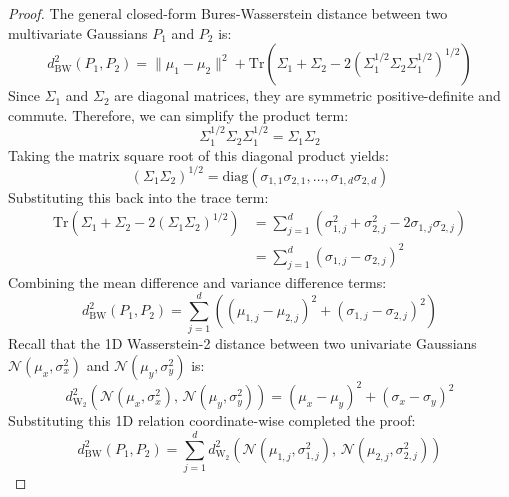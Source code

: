 \documentclass{article}
\theoremstyle{plain}
\theoremstyle{definition}
\theoremstyle{remark}
\begin{document}
\begin{proof}
The general closed-form Bures-Wasserstein distance between two multivariate Gaussians $P_1$ and $P_2$ is:
\begin{equation}
  d_{\mathrm{BW}}^2(P_1, P_2) = \|\mu_1 - \mu_2\|^2 + \mathrm{Tr}\left( \Sigma_1 + \Sigma_2 - 2 \left( \Sigma_1^{1/2} \Sigma_2 \Sigma_1^{1/2} \right)^{1/2} \right)
\end{equation}
Since $\Sigma_1$ and $\Sigma_2$ are diagonal matrices, they are symmetric positive-definite and commute. Therefore, we can simplify the product term:
\begin{equation}
  \Sigma_1^{1/2} \Sigma_2 \Sigma_1^{1/2} = \Sigma_1 \Sigma_2
\end{equation}
Taking the matrix square root of this diagonal product yields:
\begin{equation}
  \left( \Sigma_1 \Sigma_2 \right)^{1/2} = \mathrm{diag}(\sigma_{1, 1}\sigma_{2, 1}, \dots, \sigma_{1, d}\sigma_{2, d})
\end{equation}
Substituting this back into the trace term:
\begin{equation}
\begin{split}
  \mathrm{Tr}\left( \Sigma_1 + \Sigma_2 - 2 \left( \Sigma_1 \Sigma_2 \right)^{1/2} \right) &= \sum_{j=1}^d \left( \sigma_{1, j}^2 + \sigma_{2, j}^2 - 2 \sigma_{1, j} \sigma_{2, j} \right) \\
  &= \sum_{j=1}^d (\sigma_{1, j} - \sigma_{2, j})^2
\end{split}
\end{equation}
Combining the mean difference and variance difference terms:
\begin{equation}
  d_{\mathrm{BW}}^2(P_1, P_2) = \sum_{j=1}^d \left( (\mu_{1, j} - \mu_{2, j})^2 + (\sigma_{1, j} - \sigma_{2, j})^2 \right)
\end{equation}
Recall that the 1D Wasserstein-2 distance between two univariate Gaussians $\mathcal{N}(\mu_x, \sigma_x^2)$ and $\mathcal{N}(\mu_y, \sigma_y^2)$ is:
\begin{equation}
  d_{\mathrm{W}_2}^2\left( \mathcal{N}(\mu_x, \sigma_x^2), \, \mathcal{N}(\mu_y, \sigma_y^2) \right) = (\mu_x - \mu_y)^2 + (\sigma_x - \sigma_y)^2
\end{equation}
Substituting this 1D relation coordinate-wise completed the proof:
\begin{equation}
  d_{\mathrm{BW}}^2(P_1, P_2) = \sum_{j=1}^d d_{\mathrm{W}_2}^2\left( \mathcal{N}(\mu_{1, j}, \sigma_{1, j}^2), \, \mathcal{N}(\mu_{2, j}, \sigma_{2, j}^2) \right)
\end{equation}
\end{proof}
\end{document}
